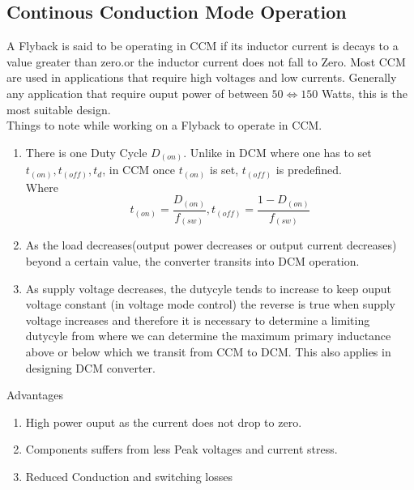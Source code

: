 \documentclass{article}
\begin{document}
\subsection[Continous Conduction Mode Operation]{Continous Conduction Mode Operation}
A Flyback is said to be operating in CCM if its inductor current is decays to a value greater than zero.or the inductor current does not fall to Zero. Most CCM are used in applications that require high voltages and low currents. Generally any application that require ouput power of between $50 \Leftrightarrow 150$ Watts, this is the most suitable design.\\
Things to note while working on a Flyback to operate in CCM.
\begin{enumerate}
    \item There is one Duty Cycle $D_(on)$. Unlike in DCM where one has to set $t_(on), t_(off), t_d$, in CCM once $t_(on)$ is set, $t_(off)$ is predefined.
    \\Where  \begin{equation*}
        t_(on) = \frac{D_(on)}{f_(sw)} , t_(off) = \frac{1-D_(on)}{f_(sw)}
    \end{equation*}
    \item As the load decreases(output power decreases or output current decreases) beyond a certain value, the converter transits into DCM operation.
    \item As supply voltage decreases, the dutycyle tends to increase to keep ouput voltage constant (in voltage mode control) the reverse is true when supply voltage increases and therefore it is necessary to determine a limiting dutycyle from where we can determine the maximum primary inductance above or below which we transit from CCM to DCM. This also applies in designing DCM converter.
\end{enumerate}
Advantages\\ \begin{enumerate}
    \item High power ouput as the current does not drop to zero.
    \item Components suffers from less Peak voltages and current stress.
    \item Reduced Conduction and switching losses 
\end{enumerate}
\end{document}

